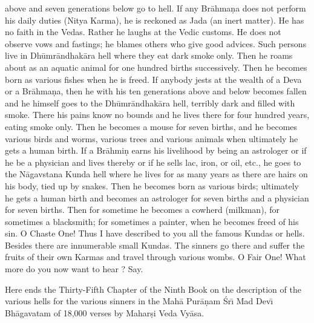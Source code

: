 above and seven generations below go to hell. If any Br\=ahma\d{n}a does not perform his daily duties (Nitya Karma), he is reckoned as Jada (an inert matter). He has no faith in the Vedas. Rather he laughs at the Vedic customs. He does not observe vows and fastings; he blames others who give good advices. Such persons live in Dh\=umr\=andhak\=ara hell where they eat dark smoke only. Then he roams about as an aquatic animal for one hundred births successively. Then he becomes born as various fishes when he is freed. If anybody jests at the wealth of a Deva or a Br\=ahma\d{n}a, then he with his ten
generations above and below becomes fallen and he himself goes to the Dh\=umr\=andhak\=ara hell, terribly dark and filled with smoke. There his pains know no bounds and he lives there for four hundred years, eating smoke only. Then he becomes a mouse for seven births, and he becomes various birds and worms, various trees and various animals when ultimately he gets a human birth. If a Br\=ahmi\d{n} earns his livelihood by being an astrologer or if he be a physician and lives thereby or if he sells lac, iron, or oil, etc., he goes to the N\=agavstana Kunda hell where he lives for as many years as there are hairs on his body, tied up by snakes. Then he becomes born as various birds; ultimately he gets a human birth and becomes an astrologer for seven births and a physician for seven births. Then for sometime he becomes a cowherd (milkman), for sometimes a blacksmith; for sometimes a painter, when he becomes freed of his sin. O Chaste One! Thus I have described to you all the famous Kundas or hells. Besides there are innumerable small Kundas. The sinners go there and suffer the fruits of their own Karmas and travel through various wombs. O Fair One! What more do you now want to hear ? Say.

Here ends the Thirty-Fifth Chapter of the Ninth Book on the description of the various hells for the various sinners in the Mah\=a Pur\=a\d{n}am \'Sr\={\i} Mad Dev\={\i} Bh\=agavatam of 18,000 verses by Mahar\d{s}i Veda Vy\=asa.



